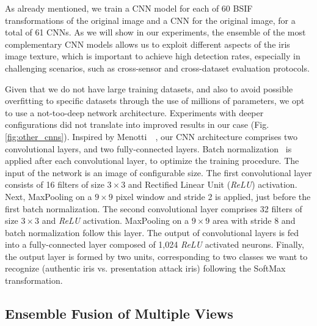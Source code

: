 As already mentioned, we train a CNN model for each of 60 BSIF transformations of the original image and a CNN for the original image, for a total of 61 CNNs.
As we will show in our experiments, the ensemble of the most complementary CNN models allows us to exploit different aspects of the iris image texture, which is important to achieve high detection rates, especially in challenging scenarios, such as cross-sensor and cross-dataset evaluation protocols.


Given that we do not have large training datasets, and also to avoid possible overfitting to specific datasets through the use of millions of parameters, we opt to use a not-too-deep network architecture. Experiments with deeper configurations did not translate into improved results in our case (Fig. \ref{fig:other_cnns}). Inspired by Menotti~\etal~\cite{Menotti:TIFS:2015}, our CNN architecture comprises two convolutional layers, and two fully-connected layers. Batch normalization~\cite{ioffe2015batch} is applied after each convolutional layer, to optimize the training procedure. The input of the network is an image of configurable size. The first convolutional layer consists of 16 filters of size $3 \times 3$ and Rectified Linear Unit (\emph{ReLU}) activation. Next, MaxPooling on a $9 \times 9$ pixel window and stride 2 is applied, just before the first batch normalization. The second convolutional layer comprises 32 filters of size $3 \times 3$ and \emph{ReLU} activation. 
MaxPooling on a $9 \times 9$ area with stride 8 and batch normalization follow this layer. The output of convolutional layers is fed into a fully-connected layer composed of 1,024 \emph{ReLU} activated neurons. Finally, the output layer is formed by two units, corresponding to two classes we want to recognize (authentic iris vs. presentation attack iris) following the SoftMax transformation. 

\subsection{Ensemble Fusion of Multiple Views}

